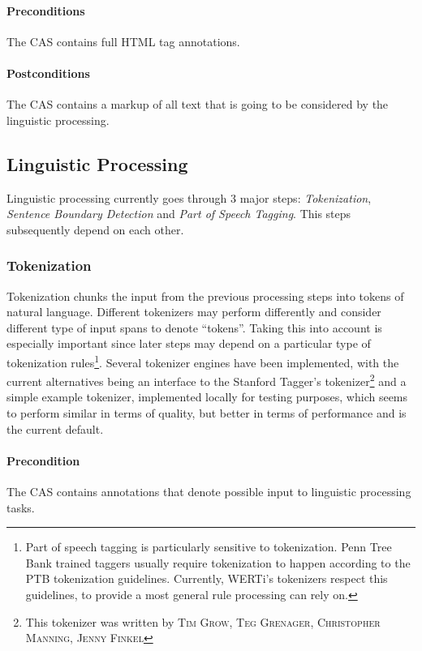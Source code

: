 \documentclass[12pt]{scrartcl}
\begin{document}
\paragraph{Preconditions} The CAS contains full HTML tag annotations.
\paragraph{Postconditions} The CAS contains a markup of all text that is going
to be considered by the linguistic processing.

\subsection{Linguistic Processing}

Linguistic processing currently goes through 3 major steps: \emph{Tokenization},
\emph{Sentence Boundary Detection} and \emph{Part of Speech Tagging}. This
steps subsequently depend on each other.

\subsubsection{Tokenization}

Tokenization chunks the input from the previous processing steps into tokens of
natural language. Different tokenizers may perform differently and consider
different type of input spans to denote ``tokens''. Taking this into account is especially important
since later steps may depend on a particular type of tokenization 
rules\footnote{Part of speech tagging is particularly sensitive to
tokenization. Penn Tree Bank trained taggers usually require tokenization to
happen according to the PTB tokenization guidelines. Currently, WERTi's
tokenizers respect this guidelines, to provide a most general rule processing can
rely on.}. Several tokenizer engines have been implemented, with the current
alternatives being an interface to the Stanford Tagger's
tokenizer\footnote{This tokenizer was written by \textsc{Tim Grow}, \textsc{Teg
Grenager}, \textsc{Christopher Manning}, \textsc{Jenny Finkel}} 
and a simple example tokenizer, implemented locally for testing purposes, which
seems to perform similar in terms of quality, but better in terms of performance
and is the current default.

\paragraph{Precondition} The CAS contains annotations that denote possible input to
linguistic processing tasks.
\end{document}
